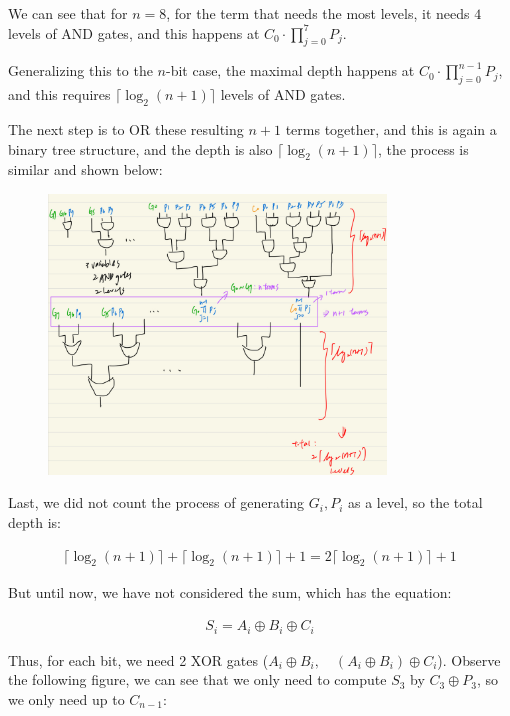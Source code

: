\documentclass{article}
\begin{document}
We can see that for $n = 8$, for the term that needs the most levels, it needs $4$ levels of AND gates, 
and this happens at $C_0 \cdot \prod_{j=0}^{7} P_j$.
\bigskip

Generalizing this to the $n$-bit case, the maximal depth happens at $C_0 \cdot \prod_{j=0}^{n-1} P_j$,
and this requires $\lceil \log_2(n+1) \rceil$ levels of AND gates.
\bigskip

The next step is to OR these resulting $n+1$ terms together, and this is again a binary tree structure,
and the depth is also $\lceil \log_2(n+1) \rceil$, the process is similar and shown below:

\begin{figure}[H]
    \centering
    \includegraphics[width=0.8\textwidth]{7_OR_tree.jpeg}
\end{figure}

Last, we did not count the process of generating $G_i, P_i$ as a level, so the total depth is:

\begin{align*}
    \lceil \log_2(n+1) \rceil + \lceil \log_2(n+1) \rceil + 1 = 2 \lceil \log_2(n+1) \rceil + 1
\end{align*}

But until now, we have not considered the sum, which has the equation:

\begin{align*}
    S_i = A_i \oplus B_i \oplus C_i
\end{align*}

Thus, for each bit, we need 2 XOR gates ($A_i \oplus B_i, \quad (A_i \oplus B_i) \oplus C_i$).
Observe the following figure, we can see that we only need to compute $S_3$ by $C_3 \oplus P_3$,
so we only need up to $C_{n-1}$:
\end{document}
